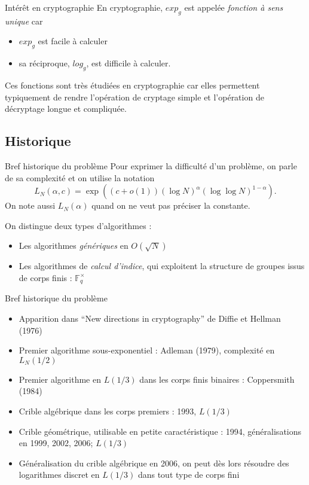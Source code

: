 \documentclass[xcolor=x11names,compress]{beamer}
\theoremstyle{break}
\theoremstyle{sc}
\theoremstyle{definition}
\theoremstyle{remark}
\begin{document}
\begin{frame}{Intérêt en cryptographie}
  En cryptographie, $exp_g$ est appelée \emph{fonction à sens unique} car
  \begin{itemize}
    \item $exp_g$ est facile à calculer
    \item sa réciproque, $log_g$, est difficile à calculer.
  \end{itemize}

  Ces fonctions sont très étudiées en cryptographie car elles permettent
  typiquement de rendre l'opération de cryptage simple et l'opération de
  décryptage longue et compliquée.
\end{frame}

\subsection{Historique}
\begin{frame}{Bref historique du problème}
  Pour exprimer la difficulté d'un problème, on parle de sa complexité et on
  utilise la notation 
  \[
    L_N(\alpha, c) = \exp((c+o(1))(\log N)^\alpha(\log\log N)^{1-\alpha}).
  \]
  On note aussi $L_N(\alpha)$ quand on ne veut pas préciser la constante.

  On distingue deux types d'algorithmes :
  \begin{itemize}
    \item Les algorithmes \emph{génériques} en $O(\sqrt N)$
    \item Les algorithmes de \emph{calcul d'indice}, qui exploitent la structure de
      groupes issus de corps finis : $\mathbb{F}_{q}^\times$
  \end{itemize}
\end{frame}

\begin{frame}{Bref historique du problème}
  \begin{itemize}
    \item Apparition dans ``New directions in cryptography'' de Diffie et
      Hellman (1976)
    \item Premier algorithme sous-exponentiel : Adleman (1979), complexité en
      $L_N(1/2)$
  \item Premier algorithme en $L(1/3)$ dans les corps finis binaires : Coppersmith (1984)
  \item Crible algébrique dans les corps premiers : 1993,
    $L(1/3)$
  \item Crible géométrique, utilisable en petite caractéristique : 1994,
    généralisations en 1999, 2002, 2006; $L(1/3)$
  \item Généralisation du crible algébrique en 2006, on peut dès lors résoudre
    des logarithmes discret en $L(1/3)$ dans tout type de corps fini
  \end{itemize}
\end{frame}
\end{document}
